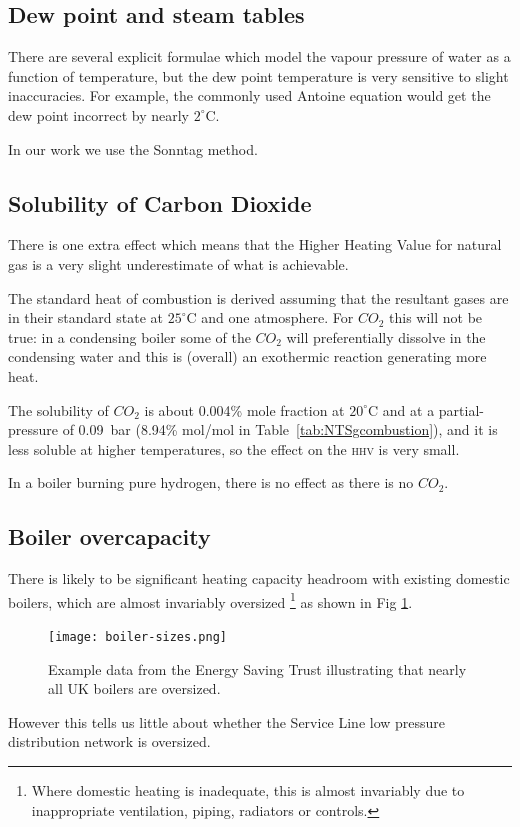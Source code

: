 \documentclass[5p]{elsarticle} %
\begin{document}
\subsection{Dew point and steam tables}
\label{appendix:steam-tables}
There are several explicit formulae which model the vapour pressure of water as a function of temperature, but the dew point temperature is very sensitive to slight inaccuracies. For example, the commonly used Antoine equation would get the dew point incorrect by nearly $2^\circ$C.

In our work we use the Sonntag method\citep{Perry2008}.

\subsection{Solubility of Carbon Dioxide}
\label{sec:CO2solubility}
There is one extra effect which means that the Higher Heating Value for natural gas is a very slight underestimate of what is achievable.

The standard heat of combustion is derived assuming that the resultant gases are in their standard state at $25^\circ$C and one atmosphere. For $CO_2$ this will not be true: in a condensing boiler some of the $CO_2$ will preferentially dissolve in the condensing water and this is (overall) an exothermic reaction generating more heat.

The solubility of $CO_2$ is about 0.004\% mole fraction\citep{Carroll1991} at $20^\circ$C and at a partial-pressure of 0.09~bar (8.94\% mol/mol in Table~\ref{tab:NTSgcombustion}), and it is less soluble at higher temperatures, so the effect on the \textsc{hhv} is very small.

In a boiler burning pure hydrogen, there is no effect as there is no $CO_2$.

\subsection{Boiler overcapacity}
\label{appendix:boilerovercap}
There is likely to be significant heating capacity headroom with existing domestic boilers, which are almost invariably oversized\citep{Bennett2020}
\footnote{Where domestic heating is inadequate, this is almost invariably due to inappropriate ventilation, piping, radiators or controls.}
as shown in Fig \ref{fig-oversize}. 

\begin{figure}[ht]
\centering
\texttt{[image: boiler-sizes.png]}
\caption{Example data from the Energy Saving Trust\citep{GASTEC2009} illustrating that nearly all UK boilers are oversized.}
\label{fig-oversize}
\end{figure}
However this tells us little about whether the Service Line low pressure distribution network is oversized.
\end{document}
